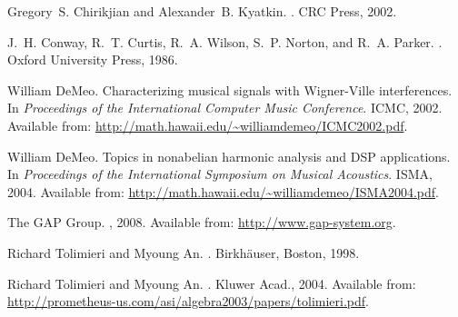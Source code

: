 \documentclass[10pt]{article}
\begin{document}
\def\cprime{$'$} \def\cprime{$'$}
  \def\ocirc#1{\ifmmode\setbox0=\hbox{$#1$}\dimen0=\ht0 \advance\dimen0
  by1pt\rlap{\hbox to\wd0{\hss\raise\dimen0
  \hbox{\hskip.2em$\scriptscriptstyle\circ$}\hss}}#1\else {\accent"17 #1}\fi}
\begin{thebibliography}{1}

Gregory~S. Chirikjian and Alexander~B. Kyatkin.
.
\newblock CRC Press, 2002.

J.~H. Conway, R.~T. Curtis, R.~A. Wilson, S.~P. Norton, and R.~A. Parker.
.
\newblock Oxford University Press, 1986.

William DeMeo.
\newblock Characterizing musical signals with {W}igner-{V}ille interferences.
\newblock In {\em Proceedings of the International Computer Music Conference}.
  ICMC, 2002.
\newblock Available from:
  \url{http://math.hawaii.edu/~williamdemeo/ICMC2002.pdf}.

William DeMeo.
\newblock Topics in nonabelian harmonic analysis and {DSP} applications.
\newblock In {\em Proceedings of the International Symposium on Musical
  Acoustics}. ISMA, 2004.
\newblock Available from:
  \url{http://math.hawaii.edu/~williamdemeo/ISMA2004.pdf}.

The GAP Group.
,
  2008.
\newblock Available from: \url{http://www.gap-system.org}.

Richard Tolimieri and Myoung An.
.
\newblock Birkh\"{a}user, Boston, 1998.

Richard Tolimieri and Myoung An.
.
\newblock Kluwer Acad., 2004.
\newblock Available from:
  \url{http://prometheus-us.com/asi/algebra2003/papers/tolimieri.pdf}.

\end{thebibliography}
\end{document}
